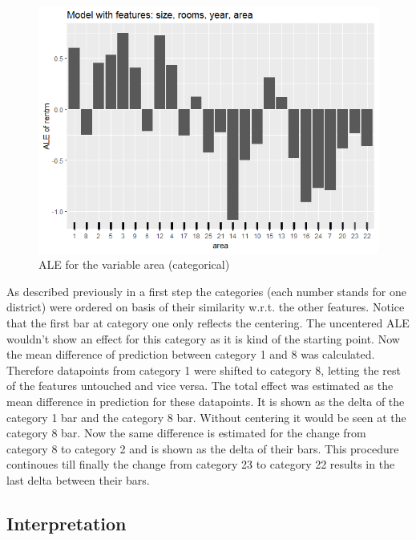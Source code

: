 \documentclass[
]{krantz}
\begin{document}
\begin{figure}
\includegraphics[width=1\linewidth]{images/ALE_2_example_cat_} \caption{ALE for the variable area (categorical)}\label{fig:ALE2catfullmod}
\end{figure}



As described previously in a first step the categories (each number stands for one district) were ordered on basis of their similarity w.r.t. the other features. Notice that the first bar at category one only reflects the centering. The uncentered ALE wouldn't show an effect for this category as it is kind of the starting point.
Now the mean difference of prediction between category 1 and 8 was calculated. Therefore datapoints from category 1 were shifted to category 8, letting the rest of the features untouched and vice versa. The total effect was estimated as the mean difference in prediction for these datapoints. It is shown as the delta of the category 1 bar and the category 8 bar. Without centering it would be seen at the category 8 bar. Now the same difference is estimated for the change from category 8 to category 2 and is shown as the delta of their bars.
This procedure continoues till finally the change from category 23 to category 22 results in the last delta between their bars.

\hypertarget{interpretation}{%
\subsection{Interpretation}\label{interpretation}}
\end{document}
